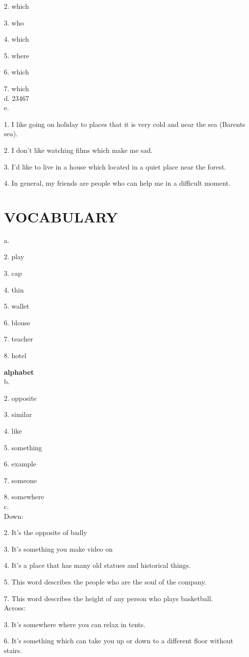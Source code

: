 \documentclass{article}
\begin{document}
2. which

3. who

4. which

5. where

6. which

7. which
\\
d.  23467 
\\
e. 

1. I like going on holiday to places that it is very cold and near the sea (Barents sea).

2. I don't like watching films which make me sad.

3. I'd like to live in a house which located in a quiet place near the forest.

4. In general, my friends are people who can help me in a difficult moment.
\section*{VOCABULARY}
a.

2. play

3. cap

4. thin

5. wallet

6. blouse

7. teacher

8. hotel

\textbf{alphabet}
\\
b. 

2. opposite

3. similar

4. like

5. something

6. example

7. someone

8. somewhere
\\
c.
\\
Down:

2. It's the opposite of badly

3. It's something you make video on

4. It's a place that has many old statues and historical things.

5. This word describes the people who are the soul of the company.

7. This word describes the height of any person who plays basketball.
\\
Across:

3. It's somewhere where you can relax in tents.

6. It's something which can take you up or down to a different floor without stairs.
\end{document}
